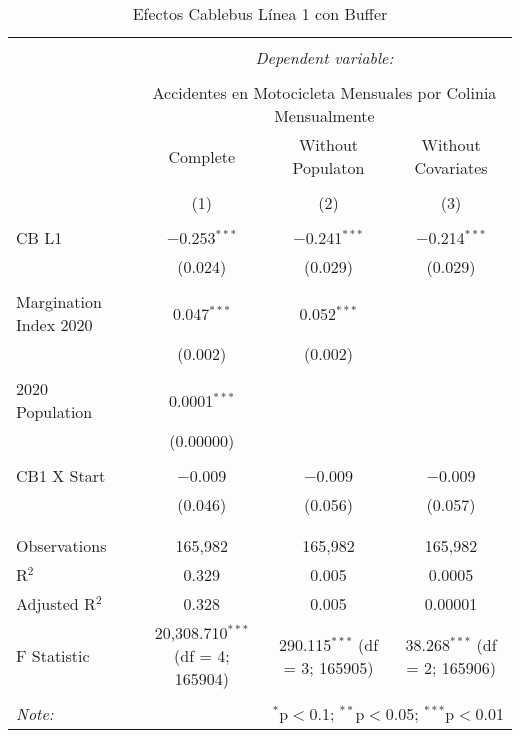 
\begin{table}[!htbp] \centering 
  \caption{Efectos Cablebus Línea 1 con Buffer} 
  \label{} 
\begin{tabular}{@{\extracolsep{5pt}}lccc} 
\\[-1.8ex]\hline 
\hline \\[-1.8ex] 
 & \multicolumn{3}{c}{\textit{Dependent variable:}} \\ 
\cline{2-4} 
\\[-1.8ex] & \multicolumn{3}{c}{Accidentes en Motocicleta Mensuales por Colinia Mensualmente} \\ 
 & Complete & Without Populaton & Without Covariates \\ 
\\[-1.8ex] & (1) & (2) & (3)\\ 
\hline \\[-1.8ex] 
 CB L1 & $-$0.253$^{***}$ & $-$0.241$^{***}$ & $-$0.214$^{***}$ \\ 
  & (0.024) & (0.029) & (0.029) \\ 
  & & & \\ 
 Margination Index 2020 & 0.047$^{***}$ & 0.052$^{***}$ &  \\ 
  & (0.002) & (0.002) &  \\ 
  & & & \\ 
 2020 Population & 0.0001$^{***}$ &  &  \\ 
  & (0.00000) &  &  \\ 
  & & & \\ 
 CB1 X Start & $-$0.009 & $-$0.009 & $-$0.009 \\ 
  & (0.046) & (0.056) & (0.057) \\ 
  & & & \\ 
\hline \\[-1.8ex] 
Observations & 165,982 & 165,982 & 165,982 \\ 
R$^{2}$ & 0.329 & 0.005 & 0.0005 \\ 
Adjusted R$^{2}$ & 0.328 & 0.005 & 0.00001 \\ 
F Statistic & 20,308.710$^{***}$ (df = 4; 165904) & 290.115$^{***}$ (df = 3; 165905) & 38.268$^{***}$ (df = 2; 165906) \\ 
\hline 
\hline \\[-1.8ex] 
\textit{Note:}  & \multicolumn{3}{r}{$^{*}$p$<$0.1; $^{**}$p$<$0.05; $^{***}$p$<$0.01} \\ 
\end{tabular} 
\end{table} 
